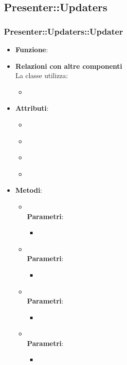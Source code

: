 \subsection{Presenter::Updaters}
\subsubsection{Presenter::Updaters::Updater}
\begin{itemize}
\item\textbf{Funzione}:
\item\textbf{Relazioni con altre componenti}\\
La classe utilizza:
	\begin{itemize}
		\item
	\end{itemize}
\item\textbf{Attributi}:
	\begin{itemize}
		\item\code{}\\
		\item\code{}\\
		\item\code{}\\
		\item\code{}\\
	\end{itemize}
\item\textbf{Metodi}:
	\begin{itemize}
		\item\code{}\\
		\textbf{Parametri}:
			\begin{itemize}
				\item\code{}\\
			\end{itemize}
		\item\code{}\\
		\textbf{Parametri}:
			\begin{itemize}
				\item\code{}\\
			\end{itemize}
		\item\code{}\\
		\textbf{Parametri}:
			\begin{itemize}
				\item\code{}\\
			\end{itemize}
		\item\code{}\\
		\textbf{Parametri}:
			\begin{itemize}
				\item\code{}\\
			\end{itemize}
	\end{itemize}
\end{itemize}

